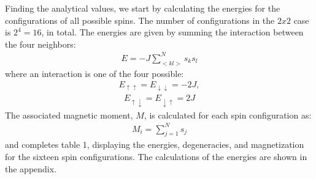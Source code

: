 \documentclass[12pt,english,a4paper]{article}
\begin{document}
Finding the analytical values, we start by calculating the energies for the configurations of all possible spins. The number of configurations in the $2x2$ case is  $2^4 = 16$, in total. The energies are given by summing the interaction between the four neighbors:
\begin{align*}
    E = -J \sum_{<kl>}^N s_ks_l 
\end{align*}
where an interaction is one of the four possible:
\begin{align*}
    E_{\uparrow \uparrow} = E_{\downarrow \downarrow} = -2J, 
\end{align*}
\begin{align*}
    E_{\uparrow \downarrow} = E_{\downarrow \uparrow} = 2J
\end{align*}
The associated magnetic moment, $M$, is calculated for each spin configuration as:
\begin{align*}
    M_{i}=\sum_{j=1}^{N} s_{j}
\end{align*}
and completes table 1, displaying the energies, degeneracies, and magnetization for the sixteen spin configurations. The calculations of the energies are shown in the appendix. 
\end{document}

